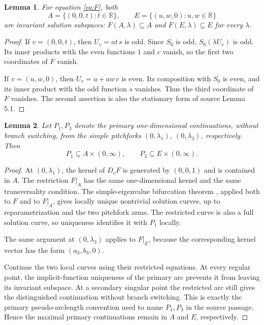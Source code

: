 \documentclass[11pt]{article}
\newtheorem{lemma}{Lemma}
\newcommand{\R}{\mathbb R}
\begin{document}
\begin{lemma}\label{lem:invariant}
For equation \eqref{eq:F}, both
\[
 A=\{(0,0,t):t\in\R\},\qquad
 E=\{(u,w,0):u,w\in\R\}
\]
are invariant solution subspaces: \(F(A,\lambda)\subseteq A\) and
\(F(E,\lambda)\subseteq E\) for every \(\lambda\).
\end{lemma}

\begin{proof}
If \(v=(0,0,t)\), then \(U_v=at\,s\) is odd.  Since \(S_0\) is odd,
\(S_0(\lambda U_v)\) is odd.  Its inner products with the even functions
\(1\) and \(c\) vanish, so the first two coordinates of \(F\) vanish.

If \(v=(u,w,0)\), then \(U_v=u+aw\,c\) is even.  Its composition with
\(S_0\) is even, and its inner product with the odd function \(s\) vanishes.
Thus the third coordinate of \(F\) vanishes.  The second assertion is also
the stationary form of source Lemma 5.1.
\end{proof}

\begin{lemma}\label{lem:branches}
Let \(P_1,P_3\) denote the primary one-dimensional continuations, without
branch switching, from the simple pitchforks
\((0,\lambda_1)\), \((0,\lambda_3)\), respectively.  Then
\[
 P_1\subseteq A\times(0,\infty),\qquad
 P_3\subseteq E\times(0,\infty).
\]
\end{lemma}

\begin{proof}
At \((0,\lambda_1)\), the kernel of \(D_vF\) is generated by
\((0,0,1)\) and is contained in \(A\).  The restriction \(F|_A\) has the
same one-dimensional kernel and the same transversality condition.  The
simple-eigenvalue bifurcation theorem \cite{CR}, applied both to \(F\) and to
\(F|_A\), gives locally unique nontrivial solution curves, up to
reparametrization and the two pitchfork arms.  The restricted curve is also a
full solution curve, so uniqueness identifies it with \(P_1\) locally.

The same argument at \((0,\lambda_3)\) applies to \(F|_E\), because the
corresponding kernel vector has the form \((a_3,b_3,0)\).

Continue the two local curves using their restricted equations.  At every
regular point, the implicit-function uniqueness of the primary arc prevents
it from leaving its invariant subspace.  At a secondary singular point the
restricted arc still gives the distinguished continuation without branch
switching.  This is exactly the primary pseudo-arclength convention used to
name \(P_1,P_3\) in the source passage.  Hence the maximal primary
continuations remain in \(A\) and \(E\), respectively.
\end{proof}
\end{document}
